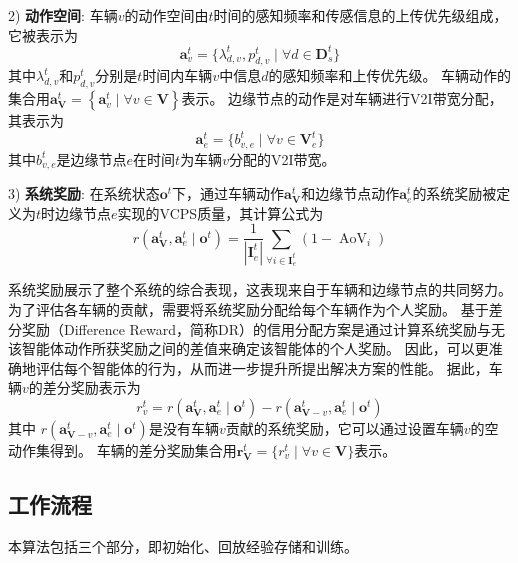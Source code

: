 2) \textbf{动作空间}: 车辆$v$的动作空间由$t$时间的感知频率和传感信息的上传优先级组成，它被表示为 
	\begin{equation}
		\boldsymbol{a}_{v}^{t}=\{ \lambda_{d, v}^{t}, p_{d, v}^{t} \mid \forall d \in \mathbf{D}_{s}^t\}
	\end{equation}
	\noindent 其中$\lambda_{d, v}^{t}$和$p_{d, v}^{t}$分别是$t$时间内车辆$v$中信息$d$的感知频率和上传优先级。
	车辆动作的集合用$\boldsymbol{a}_{\mathbf{V}}^{t} = \left\{\boldsymbol{a}_{v}^{t}\mid \forall v \in \mathbf{V}\right\}$表示。
	边缘节点的动作是对车辆进行V2I带宽分配，其表示为 
	\begin{equation}
		\boldsymbol{a}_{e}^{t}=\{b_{v, e}^{t} \mid \forall v \in \mathbf{V}_{e}^{t}\}
	\end{equation}
	其中$b_{v, e}^t$是边缘节点$e$在时间$t$为车辆$v$分配的V2I带宽。
	
3) \textbf{系统奖励}: 在系统状态$\boldsymbol{o}^{t}$下，通过车辆动作$\boldsymbol{a}_{\mathbf{V}}^{t}$和边缘节点动作$\boldsymbol{a}_{e}^{t}$的系统奖励被定义为$t$时边缘节点$e$实现的VCPS质量，其计算公式为
	\begin{equation}
		r\left(\boldsymbol{a}_{\mathbf{V}}^{t},\boldsymbol{a}_{e}^{t} \mid \boldsymbol{o}^{t}\right)=\frac{1}{\left|\mathbf{I}_e^t\right|} \sum_{\forall i \in \mathbf{I}_e^t}\left(1 -\operatorname{AoV}_{i} \right)
	\end{equation}
	
系统奖励展示了整个系统的综合表现，这表现来自于车辆和边缘节点的共同努力。
为了评估各车辆的贡献，需要将系统奖励分配给每个车辆作为个人奖励。
基于差分奖励（Difference Reward，简称DR）的信用分配方案是通过计算系统奖励与无该智能体动作所获奖励之间的差值来确定该智能体的个人奖励。
因此，可以更准确地评估每个智能体的行为，从而进一步提升所提出解决方案的性能。
据此，车辆$v$的差分奖励表示为\cite{foerster2018counterfactual}
\begin{equation}
r_{v}^{t}=r\left(\boldsymbol{a}_{\mathbf{V}}^{t},\boldsymbol{a}_{e}^{t} \mid \boldsymbol{o}^{t}\right)-r\left(\boldsymbol{a}_{\mathbf{V}-v}^{t},\boldsymbol{a}_{e}^{t} \mid \boldsymbol{o}^{t}\right)
\end{equation}
\noindent 其中 $r\left(\boldsymbol{a}_{\mathbf{V}-v}^{t},\boldsymbol{a}_{e}^{t} \mid \boldsymbol{o}^{t}\right)$是没有车辆$v$贡献的系统奖励，它可以通过设置车辆$v$的空动作集得到。
车辆的差分奖励集合用$\boldsymbol{r}_{\mathbf{V}}^{t}=\{ r_{v}^{t} \mid \forall v \in \mathbf{V}\}$表示。

\subsection{工作流程}
本算法包括三个部分，即初始化、回放经验存储和训练。

